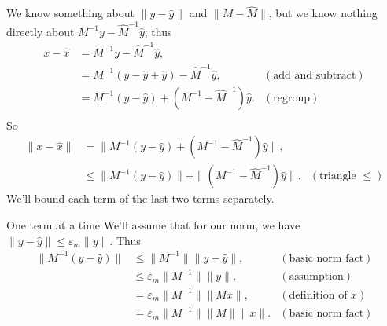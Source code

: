 \documentclass[usenames,dvipsnames,fleqn]{beamer}
\theoremstyle{definition}
\begin{document}
\begin{frame}

We know something about \(\| y - \widehat y\| \) and  \( \| M  - \widehat M \| \), but we know nothing directly about
\(M^{-1} y - \widehat M^{-1} \widehat y\); thus
\begin{align*}
   x - \widehat x &= M^{-1} y - \widehat M^{-1} \widehat y, \\
       &=M^{-1} \left(y - \widehat y + \widehat y \right)  - \widehat M^{-1} \widehat y, &(\mbox{add and subtract}) \\
       &= M^{-1} \left(y - \widehat y \right) + \left(M^{-1} - \widehat M^{-1} \right) \widehat y.  &(\mbox{regroup})\\
\end{align*}
So
\begin{align*}
  \|  x - \widehat x \| &= \|M^{-1} \left(y - \widehat y \right) + \left(M^{-1} - \widehat M^{-1} \right) \widehat y \|,\\
       &\leq  \|M^{-1} \left(y - \widehat y \right) \| + \| \left(M^{-1} - \widehat M^{-1} \right) \widehat y \|. &(\mbox{triangle $\leq$})
\end{align*}
We'll bound each term of the last two terms separately.

\end{frame}
\begin{frame}{One term at a time}
We'll assume that for our norm, we have $\| y - \widehat y  \| \leq \varepsilon_m \| y \|$.
Thus
\begin{align*}
   \|M^{-1} \left(y - \widehat y \right) \| &\leq \| M^{-1} \| \| y - \widehat y  \|,  &(\mbox{basic norm fact}) \\
               &\leq  \varepsilon_m \| M^{-1} \| \| y  \|, &(\mbox{assumption}) \\
               &= \varepsilon_m \| M^{-1} \|  \| M x  \|,  &(\mbox{definition of } x ) \\
               &=  \varepsilon_m \| M^{-1} \|  \| M  \| \|x  \|.  &(\mbox{basic norm fact}) 
\end{align*}
\end{frame}
\end{document}
